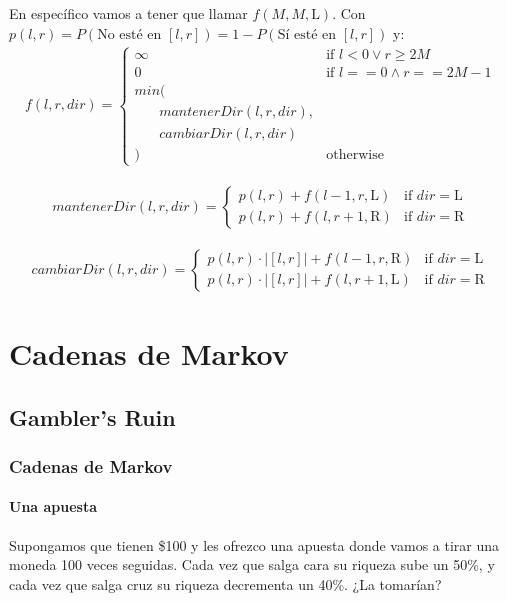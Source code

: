 \documentclass{beamer}
\newcommand{\tab}{\phantom{mm}}
\begin{document}
\begin{frame}
  \frametitle{\SECTIONB}
  \framesubtitle{\EJB}

  En específico vamos a tener que llamar \(f(M, M, \text{L})\). Con \(p(l, r) = P(\text{No esté en } [l, r]) = 1 - P(\text{Sí esté en } [l, r])\) y:
  \begin{gather*}
    f(l, r, dir) = \begin{cases}
      \infty & \text{if } l < 0 \lor r \geq 2M \\
      0 & \text{if } l == 0 \land r == 2M-1 \\
      min( \\
      \tab mantenerDir(l, r, dir), \\
      \tab cambiarDir(l, r, dir) \\
      ) & \text{otherwise}
    \end{cases}
  \end{gather*}

  \begin{gather*}
    mantenerDir(l, r, dir) = \begin{cases}
      p(l, r) + f(l-1, r, \text{L}) & \text{if } dir = \text{L} \\
      p(l, r) + f(l, r+1, \text{R}) & \text{if } dir = \text{R}
    \end{cases}
  \end{gather*}

  \begin{gather*}
    cambiarDir(l, r, dir) = \begin{cases}
      p(l, r) \cdot |[l, r]| + f(l-1, r, \text{R}) & \text{if } dir = \text{L} \\
      p(l, r) \cdot |[l, r]| + f(l, r+1, \text{L}) & \text{if } dir = \text{R}
    \end{cases}
  \end{gather*}
\end{frame}

\newcommand{\SECTIONC}{Cadenas de Markov}
\section{\SECTIONC}
\subsection{Gambler's Ruin}

\begin{frame}
  \frametitle{\SECTIONC}
  \framesubtitle{Una apuesta}

  Supongamos que tienen \$100 y les ofrezco una apuesta donde vamos a tirar una moneda 100 veces seguidas. Cada vez que salga cara su riqueza sube un 50\%, y cada vez que salga cruz su riqueza decrementa un 40\%. ¿La tomarían?
\end{frame}
\end{document}

